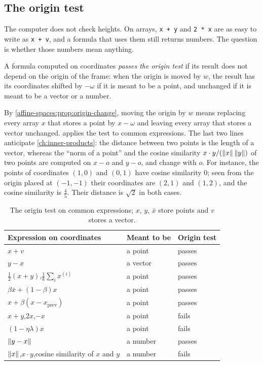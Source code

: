 \begin{notechapter}
\section{The origin test}\label{affine-spaces:sec:origin-test}

The computer does not check heights. On arrays, \texttt{x + y} and
\texttt{2 * x} are as easy to write as \texttt{x + v}, and a formula that
uses them still returns numbers. The question is whether those numbers
mean anything.

\begin{definition}\label{affine-spaces:def:origin-test}
A formula computed on coordinates \emph{passes the origin test} if its
result does not depend on the origin of the frame: when the origin is moved
by $w$, the result has its coordinates shifted by $-\omega$ if it is meant
to be a point, and unchanged if it is meant to be a vector or a number.
\end{definition}

By \cref{affine-spaces:prop:origin-change}, moving the origin by $w$ means
replacing every array $x$ that stores a point by $x - \omega$ and leaving
every array that stores a vector unchanged. 
applies the test to common expressions. The last two lines anticipate
\cref{ch:inner-products}: the distance between two points is the length of
a vector, whereas the ``norm of a point'' and the cosine similarity
$x\cdot y/(\left\|x\right\|\left\|y\right\|)$ of two points are computed on $x - o$ and
$y - o$, and change with $o$. For instance, the points of coordinates
$(1, 0)$ and $(0, 1)$ have cosine similarity $0$; seen from the origin
placed at $(-1, -1)$ their coordinates are $(2, 1)$ and $(1, 2)$, and the
cosine similarity is $\frac45$. Their distance is $\sqrt2$ in both cases.

\begin{table}[ht]
\centering
\begin{tabular}{@{}lll@{}}
\toprule
Expression on coordinates & Meant to be & Origin test \\
\midrule
$x + v$ & a point & passes \\
$y - x$ & a vector & passes \\
$\frac12(x + y)$,\quad $\frac1k\sum_ix^{(i)}$ & a point & passes \\
$\beta\bar x + (1 - \beta)x$ & a point & passes \\
$x + \beta(x - x_{\mathrm{prev}})$ & a point & passes \\
$x + y$,\quad $2x$,\quad $-x$ & a point & fails \\
$(1 - \eta\lambda)x$ & a point & fails \\
$\left\|y - x\right\|$ & a number & passes \\
$\left\|x\right\|$,\quad $x\cdot y$,\quad cosine similarity of $x$ and $y$
  & a number & fails \\
\bottomrule
\end{tabular}
\caption{The origin test on common expressions; $x$, $y$, $\bar x$ store
points and $v$ stores a vector.}
\label{affine-spaces:tab:test}
\end{table}


\end{notechapter}
